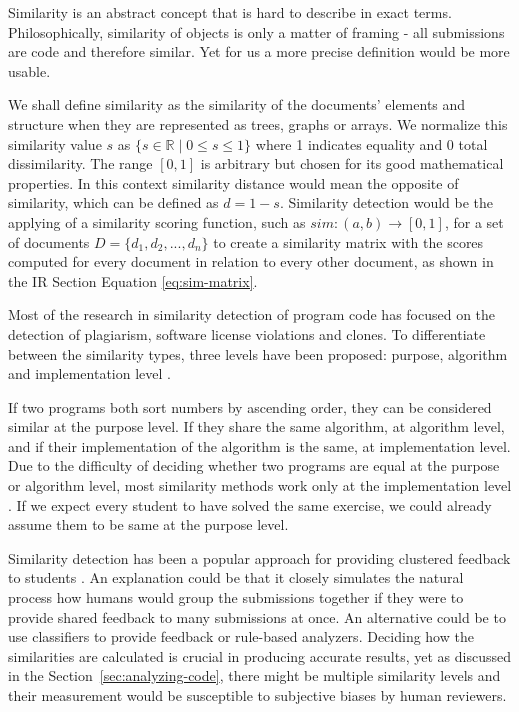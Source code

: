 Similarity is an abstract concept that is hard to describe in exact terms. Philosophically, similarity of objects is only a matter of framing - all submissions are code and therefore similar. Yet for us a more precise definition would be more usable.

We shall define similarity as the similarity of the documents' elements and structure when they are represented as trees, graphs or arrays. We normalize this similarity value $s$ as $\{ s \in \mathbb{R} \mid 0\leq s \leq 1\}$ where 1 indicates equality and 0 total dissimilarity. The range $[0,1]$ is arbitrary but chosen for its good mathematical properties. In this context similarity distance would mean the opposite of similarity, which can be defined as $d = 1 - s$. Similarity detection would be the applying of a similarity scoring function, such as $sim : (a, b) \rightarrow [0,1]$, for a set of documents $D=\{d_1, d_2, ..., d_n\}$ to create a similarity matrix with the scores computed for every document in relation to every other document, as shown in the IR Section Equation \ref{eq:sim-matrix}.

Most of the research in similarity detection of program code has focused on the detection of plagiarism, software license violations and clones. To differentiate between the similarity types, three levels have been proposed: purpose, algorithm and implementation level \cite{zhang-towards-plag-det}.

If two programs both sort numbers by ascending order, they can be considered similar at the purpose level. If they share the same algorithm, at algorithm level, and if their implementation of the algorithm is the same, at implementation level. Due to the difficulty of deciding whether two programs are equal at the purpose or algorithm level, most similarity methods work only at the implementation level \cite{chaiyong-2018}. If we expect every student to have solved the same exercise, we could already assume them to be same at the purpose level.

Similarity detection has been a popular approach for providing clustered feedback to students \cite{overcode, codewebs, divide-and-correct, fox-clust-leverage-2015, fox-roy-autostyle-msc-2016, stanford-million, survey-feedback-gen}. An explanation could be that it closely simulates the natural process how humans would group the submissions together if they were to provide shared feedback to many submissions at once. An alternative could be to use classifiers to provide feedback or rule-based analyzers. Deciding how the similarities are calculated is crucial in producing accurate results, yet as discussed in the Section~\ref{sec:analyzing-code}, there might be multiple similarity levels and their measurement would be susceptible to subjective biases by human reviewers.

